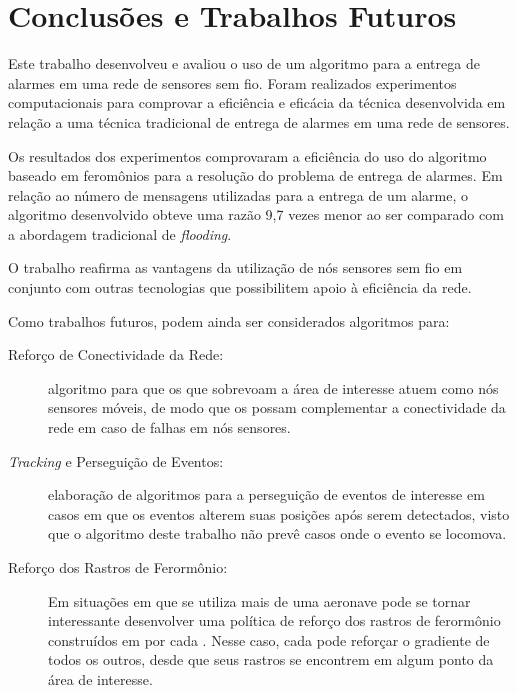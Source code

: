 \newpage\section{Conclusões e Trabalhos Futuros}
\label{chap:Conclusões}

Este trabalho desenvolveu e avaliou o uso de um algoritmo para a entrega de alarmes em uma rede de sensores sem fio. Foram realizados experimentos computacionais para comprovar a eficiência e eficácia da técnica desenvolvida em relação a uma técnica tradicional de entrega de alarmes em uma rede de sensores.

Os resultados dos experimentos comprovaram a eficiência do uso do algoritmo baseado em feromônios para a resolução do problema de entrega de alarmes. Em relação ao número de mensagens utilizadas para a entrega de um alarme, o algoritmo desenvolvido obteve uma razão 9,7 vezes menor ao ser comparado com a abordagem tradicional de \emph{flooding}.

O trabalho reafirma as vantagens da utilização de nós sensores sem fio em conjunto com outras tecnologias que possibilitem apoio à eficiência da rede.

Como trabalhos futuros, podem ainda ser considerados algoritmos para:

\begin{description}
	\item[Reforço de Conectividade da Rede:] algoritmo para que os \vants que sobrevoam a área de interesse atuem como nós sensores móveis, de modo que os \vants possam complementar a conectividade da rede em caso de falhas em nós sensores.
	
	\item[\emph{Tracking} e Perseguição de Eventos: ] elaboração de algoritmos para a perseguição de eventos de interesse em casos em que os eventos alterem suas posições após serem detectados, visto que o algoritmo deste trabalho não prevê casos onde o evento se locomova.

	\item[Reforço dos Rastros de Ferormônio:] Em situações em que se utiliza mais de uma aeronave pode se tornar interessante desenvolver uma política de reforço dos rastros de ferormônio construídos em por cada \vant. Nesse caso, cada \vant pode reforçar o gradiente de todos os outros, desde que seus rastros se encontrem em algum ponto da área de interesse.
\end{description}
\newpage
